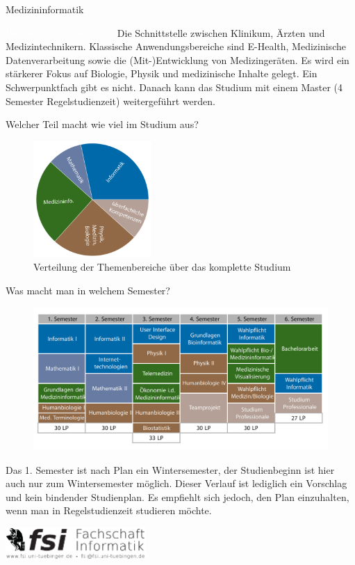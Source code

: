 	\begin{Huge}
			Medizininformatik
		\end{Huge}
		\begin{exampleblock}{\textcolor{white}{Was ist der Studiengang?}}
			Die Schnittstelle zwischen Klinikum, Ärzten und Medizintechnikern. Klassische Anwendungsbereiche sind E-Health, Medizinische Datenverarbeitung sowie die (Mit-)Entwicklung von Medizingeräten. Es wird ein stärkerer Fokus auf Biologie, Physik und medizinische Inhalte gelegt. Ein Schwerpunktfach gibt es nicht. Danach kann das Studium mit einem Master (4 Semester Regelstudienzeit) weitergeführt werden.
		\end{exampleblock}
	
	\begin{block}{Welcher Teil macht wie viel im Studium aus?}
		\begin{figure}[h!]
			\includegraphics[width=0.4\textwidth]{charts/medizininformatik-Piechart.pdf}
			\caption{Verteilung der Themenbereiche über das komplette Studium}
		\end{figure}
	\end{block}
	
	\begin{block}{Was macht man in welchem Semester?}
		\begin{figure}[h!]
			\includegraphics[width=\textwidth]{charts/medizininformatik_Studienplan_abWS18.pdf}
		\end{figure}
		Das 1. Semester ist nach Plan ein Wintersemester, der Studienbeginn ist hier auch nur zum Wintersemester möglich. 
		Dieser Verlauf ist lediglich ein Vorschlag und kein bindender Studienplan. Es empfiehlt sich jedoch, den Plan einzuhalten, wenn man in Regelstudienzeit studieren möchte.
	\end{block}
\vfill
\begin{flushright}
	\includegraphics[width=0.4\textwidth]{fsilogo.pdf}
\end{flushright}